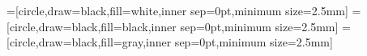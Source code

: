 \begingroup
	=[circle,draw=black,fill=white,inner sep=0pt,minimum size=2.5mm]
	=[circle,draw=black,fill=black,inner sep=0pt,minimum size=2.5mm]
	=[circle,draw=black,fill=gray,inner sep=0pt,minimum size=2.5mm]
\endgroup